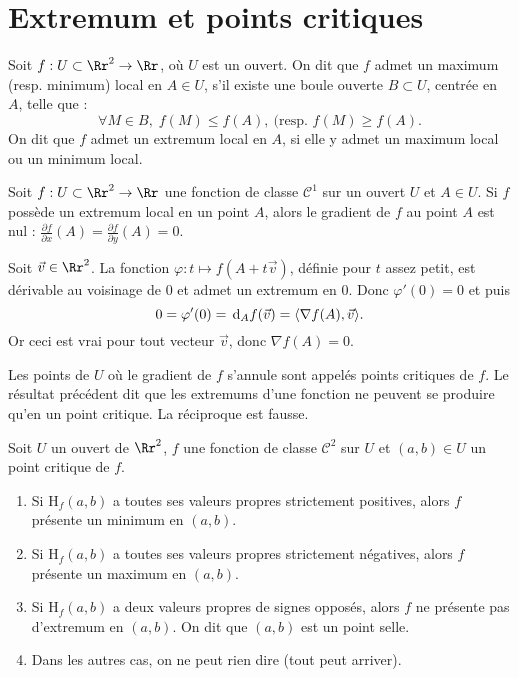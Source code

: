 \documentclass[class=report,crop=false]{standalone}
\begin{document}
\vskip8mm

\section{Extremum et points critiques}

\vskip4mm

\begin{definition}Soit $f:U\subset \Rr^2\to \Rr$, o\`u $U$ est un ouvert. On dit que $f$ admet un maximum (resp. minimum) local en $A\in U$, s'il existe une boule ouverte $B\subset U$, centrée en $A$, telle que :
$$\forall M\in B,\; f(M) \leq f(A),\: (\mbox{resp. }f(M)\geq f(A).$$
On dit que $f$ admet un extremum local en $A$, si elle y admet un maximum local ou un minimum local.
\end{definition}

\vskip4mm

\begin{proposition}Soit $f:U\subset \Rr^2\to \Rr$ une fonction de classe $\mathscr{C}^1$ sur un ouvert $U$ et $A\in U$. Si $f$ possède un extremum local en un point $A$, alors le gradient de $f$ au point $A$ est nul : $\displaystyle \frac{\partial f}{\partial x}(A)=\frac{\partial f}{\partial y}(A)=0$.
\end{proposition}

\vskip2mm

Soit $\vec{v}\in \Rr^2$. La fonction $\varphi :t\mapsto f(A+t\vec{v})$, définie pour $t$ assez petit, est dérivable au voisinage de $0$ et admet un extremum en $0$. Donc $\varphi '(0)=0$ et puis
$$0=\varphi '(0)=\,\mathrm{d} _Af(\vec{v})=\langle \nabla f(A),\vec{v}\rangle.$$
Or ceci est vrai pour tout vecteur $\vec{v}$, donc $\nabla f(A)=0$.

\vskip6mm

\noindent Les points de $U$ o\`u le gradient de $f$ s'annule sont appelés points critiques de $f$. Le résultat précédent dit que les extremums d'une fonction ne peuvent se produire qu'en un point critique. La réciproque est fausse.

\vskip6mm

\begin{theoreme}Soit $U$ un ouvert de $\Rr^2$, $f$ une fonction de classe $\mathscr{C}^2$ sur $U$ et $(a,b)\in U$ un point critique de $f$.
\begin{enumerate}
\item Si $\mathrm{H}_f(a,b)$ a toutes ses valeurs propres strictement positives, alors $f$ présente un minimum en $(a,b)$.
\item Si $\mathrm{H}_f(a,b)$ a toutes ses valeurs propres strictement négatives, alors $f$ présente un maximum en $(a,b)$.
\item Si $\mathrm{H}_f(a,b)$ a deux valeurs propres de signes opposés, alors $f$ ne présente pas d'extremum en $(a,b)$. On dit que $(a,b)$ est un point selle.
\item Dans les autres cas, on ne peut rien dire (tout peut arriver).
\end{enumerate}
\end{theoreme}
\end{document}
